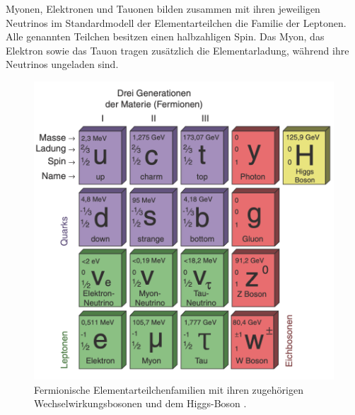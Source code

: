 \noindent Myonen, Elektronen und Tauonen bilden zusammen mit ihren jeweiligen
Neutrinos im Standardmodell der Elementarteilchen die Familie der Leptonen. Alle
genannten Teilchen besitzen einen halbzahligen Spin. Das Myon, das Elektron
sowie das Tauon tragen zusätzlich die Elementarladung, während ihre Neutrinos
ungeladen sind. \\
\FloatBarrier
\begin{figure}
  \centering
  \includegraphics[scale=0.5]{resources/standardmodell.png}
  \caption{Fermionische Elementarteilchenfamilien mit ihren zugehörigen
  Wechselwirkungsbosonen und dem Higgs-Boson \cite{großforschung}.}
  \label{fig:01}
\end{figure}
\FloatBarrier
